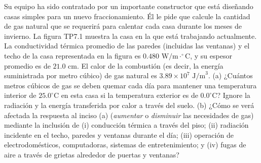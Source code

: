 \item Su equipo ha sido contratado por un importante constructor que está diseñando casas simples para un nuevo fraccionamiento. Él le pide que calcule la cantidad de gas natural que se requerirá para calentar cada casa durante los meses de invierno. La figura TP7.1 muestra la casa en la que está trabajando actualmente. La conductividad térmica promedio de las paredes (incluidas las ventanas) y el techo de la casa representada en la figura es $0.480 \text{ W/m}\cdot^\circ\text{C}$, y su espesor promedio es de $21.0 \text{ cm}$. El calor de la combustión (es decir, la energía suministrada por metro cúbico) de gas natural es $3.89 \times 10^7 \text{ J/m}^3$. 
(a) ¿Cuántos metros cúbicos de gas se deben quemar cada día para mantener una temperatura interior de $25.0 ^\circ\text{C}$ en esta casa si la temperatura exterior es de $0.0 ^\circ\text{C}$? Ignore la radiación y la energía transferida por calor a través del suelo. 
(b) ¿Cómo se verá afectada la respuesta al inciso (a) (\textit{aumentar} o \textit{disminuir} las necesidades de gas) mediante la inclusión de (i) conducción térmica a través del piso; (ii) radiación incidente en el techo, paredes y ventanas durante el día; (iii) operación de electrodomésticos, computadoras, sistemas de entretenimiento; y (iv) fugas de aire a través de grietas alrededor de puertas y ventanas?
